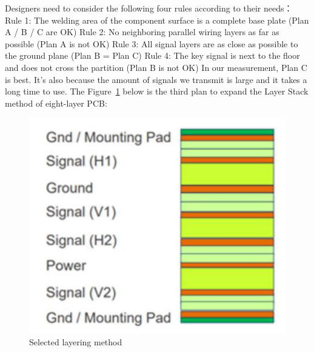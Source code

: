 Designers need to consider the following four rules according to their needs：
Rule 1: The welding area of the component surface is a complete base plate (Plan A / B / C are OK)
Rule 2: No neighboring parallel wiring layers as far as possible (Plan A is not OK)
Rule 3: All signal layers are as close as possible to the ground plane (Plan B = Plan C)
Rule 4: The key signal is next to the floor and does not cross the partition (Plan B is not OK)
In our measurement, Plan C is best. It’s also because the amount of signals we transmit is large and it takes a long time to use.
The Figure~\ref{fig:6.11} below is the third plan to expand the Layer Stack method of eight-layer PCB:

\begin{figure}[!ht]
	\centering
	\includegraphics[width=16cm]{grafiken/6.11.pdf}
	\caption{Selected layering method} 
	\label{fig:6.11}
\end{figure}
\FloatBarrier
\\

